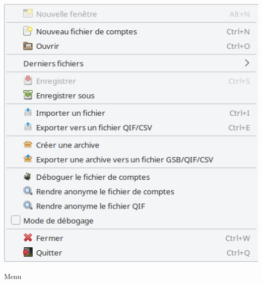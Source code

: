 \begin{minipage}{.3\linewidth}
	\vspace{10pt}				%
	\centering							%
	\includegraphics[width=1\textwidth]{image/screenshot/home_menubar_file}
	\vspace{-15pt}						%
	\captionsetup{
		type=figure,%
		name=Fig.,%
		labelsep=newline}				%
	\caption{Menu }		%
	\label{home_menubar_file}
\end{minipage}
